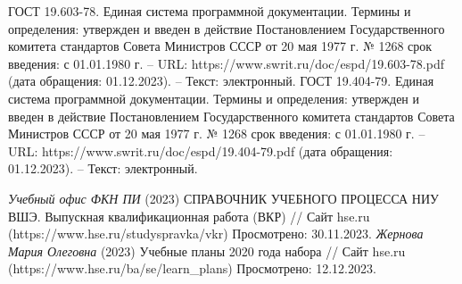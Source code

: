 \documentclass{article}
\begin{document}
\begin{itemize}
\begin{thebibliography}{}
         ГОСТ 19.603-78. Единая система программной документации. Термины и определения: утвержден и введен в действие Постановлением Государственного комитета стандартов Совета Министров СССР от 20 мая 1977 г. № 1268 срок введения: с 01.01.1980 г. – URL: https://www.swrit.ru/doc/espd/19.603-78.pdf (дата обращения: 01.12.2023). – Текст: электронный.
         ГОСТ 19.404-79. Единая система программной документации. Термины и определения: утвержден и введен в действие Постановлением Государственного комитета стандартов Совета Министров СССР от 20 мая 1977 г. № 1268 срок введения: с 01.01.1980 г. – URL: https://www.swrit.ru/doc/espd/19.404-79.pdf (дата обращения: 01.12.2023). – Текст: электронный.

         \textit{Учебный офис ФКН ПИ} (2023) СПРАВОЧНИК УЧЕБНОГО ПРОЦЕССА НИУ ВШЭ. Выпускная квалификационная работа (ВКР) // Сайт hse.ru (https://www.hse.ru/studyspravka/vkr) Просмотрено: 30.11.2023.
         \textit{Жернова Мария Олеговна} (2023) Учебные планы 2020 года набора // Сайт hse.ru (https://www.hse.ru/ba/se/learn\_plans) Просмотрено: 12.12.2023.


\end{thebibliography}
\end{itemize}
\end{document}
